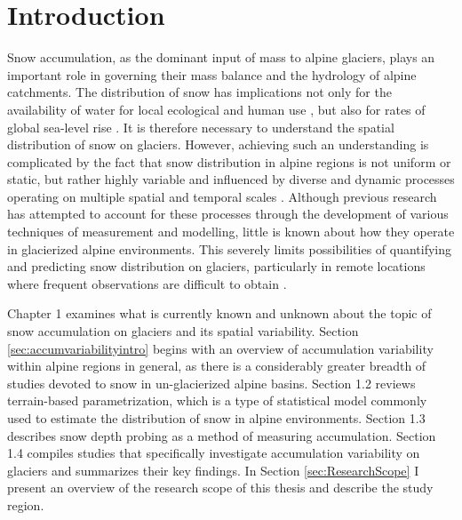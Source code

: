 \documentclass{sfuthesis}
\begin{document}
\tableofcontents\clearpage
{}\listoftables\clearpage
{}\listoffigures






\mainmatter%

\chapter{Introduction}

Snow accumulation, as the dominant input of mass to alpine glaciers, plays an important role in governing their mass balance and the hydrology of alpine catchments. The distribution of snow has implications not only for the availability of water for local ecological and human use \citep{Barnett2005,ONeel2014}, but also for rates of global sea-level rise \citep{Gardner2013}. It is therefore necessary to understand the spatial distribution of snow on glaciers. However, achieving such an understanding is complicated by the fact that snow distribution in alpine regions is not uniform or static, but rather highly variable and influenced by diverse and dynamic processes operating on multiple spatial and temporal scales \citep[e.g.][]{Clark2011}. Although previous research has attempted to account for these processes through the development of various techniques of measurement and modelling, little is known about how they operate in glacierized alpine environments. This severely limits possibilities of quantifying and predicting snow distribution on glaciers, particularly in remote locations where frequent observations are difficult to obtain \citep[e.g.][]{Nolan2015}.

Chapter 1 examines what is currently known and unknown about the topic of snow accumulation on glaciers and its spatial variability. Section \ref{sec:accumvariabilityintro} begins with an overview of accumulation variability within alpine regions in general, as there is a considerably greater breadth of studies devoted to snow in un-glacierized alpine basins. Section 1.2 reviews terrain-based parametrization, which is a type of statistical model commonly used to estimate the distribution of snow in alpine environments. Section 1.3 describes snow depth probing as a method of measuring accumulation. Section 1.4 compiles studies that specifically investigate accumulation variability on glaciers and summarizes their key findings. In Section \ref{sec:ResearchScope} I present an overview of the research scope of this thesis and describe the study region.
\end{document}
